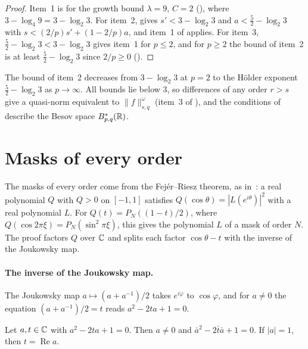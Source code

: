 \begin{proof}
\leanok
{}
Item~1 is  for the growth bound $\lambda = 9$, $C = 2$
(), where $3 - \log_4 9 = 3 - \log_2 3$. For item~2,
 gives $s' < 3 - \log_2 3$ and $a < \frac52 - \log_2 3$ with
$s < (2/p) s' + (1 - 2/p) a$, and item~1 of  applies. For item~3,
$\frac52 - \log_2 3 < 3 - \log_2 3$ gives item~1 for $p \leq 2$, and for $p \geq 2$ the bound of
item~2 is at least $\frac52 - \log_2 3$ since $2/p \geq 0$ ().
\end{proof}

The bound of item~2 decreases from $3 - \log_2 3$ at $p = 2$ to the H\"older exponent
$\frac52 - \log_2 3$ as $p \to \infty$. All bounds lie below $3$, so differences of any order
$r > s$ give a quasi-norm equivalent to $\|f\|^{\omega}_{s,q}$ (item~3 of ),
and the conditions of  describe the Besov space
$B^{s}_{p,q}(\mathbb{R})$.

\section{Masks of every order}

The masks of every order come from the Fej\'er--Riesz theorem, as in~\cite{Daubechies}: a real
polynomial $Q$ with $Q > 0$ on $[-1, 1]$ satisfies $Q(\cos\theta) = |L(e^{i\theta})|^2$ with a
real polynomial $L$. For $Q(t) = P_N((1 - t)/2)$, where $Q(\cos 2\pi\xi) = P_N(\sin^2 \pi\xi)$,
this gives the polynomial $L$ of a mask of order $N$. The proof factors $Q$ over $\mathbb{C}$ and
splits each factor $\cos\theta - t$ with the inverse of the Joukowsky map.

\paragraph{The inverse of the Joukowsky map.}
The Joukowsky map $a \mapsto (a + a^{-1})/2$ takes $e^{i\varphi}$ to $\cos\varphi$, and for
$a \neq 0$ the equation $(a + a^{-1})/2 = t$ reads $a^2 - 2ta + 1 = 0$.

\begin{lemma}[Roots of $a^2 - 2ta + 1$]
\label{lem:daub-joukowsky-equation}
\leanok
Let $a, t \in \mathbb{C}$ with $a^2 - 2ta + 1 = 0$. Then $a \neq 0$ and
$\bar a^2 - 2 \bar t \bar a + 1 = 0$. If $|a| = 1$, then $t = \operatorname{Re} a$.
\end{lemma}


